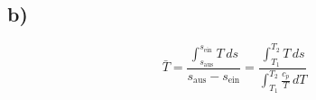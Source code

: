 

\subsection*{b)}

\[
\bar{T} = \frac{\int_{s_{\text{aus}}}^{s_{\text{ein}}} T \, ds}{s_{\text{aus}} - s_{\text{ein}}} = \frac{\int_{T_1}^{T_2} T \, ds}{\int_{T_1}^{T_2} \frac{c_p}{T} \, dT}
\]